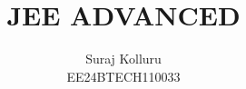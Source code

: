 \documentclass[journal]{IEEEtran}
\numberwithin{equation}{enumi}
\numberwithin{figure}{enumi}
\begin{document}
%









\title{JEE ADVANCED}
\author{Suraj Kolluru

EE24BTECH110033
}	



%
%
%

% 
%



% 
\end{document}

